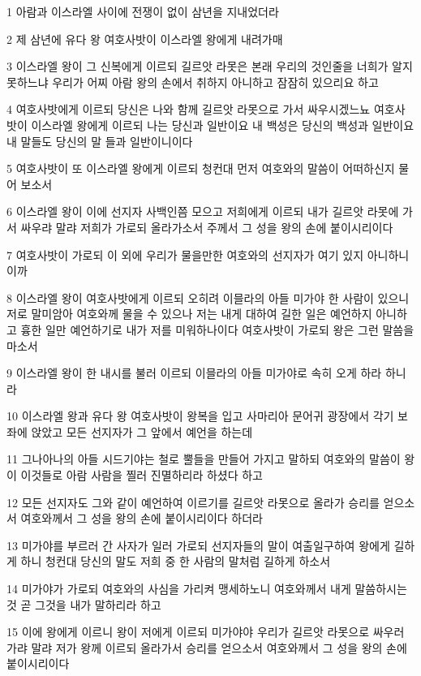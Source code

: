 \par 1 아람과 이스라엘 사이에 전쟁이 없이 삼년을 지내었더라
\par 2 제 삼년에 유다 왕 여호사밧이 이스라엘 왕에게 내려가매
\par 3 이스라엘 왕이 그 신복에게 이르되 길르앗 라못은 본래 우리의 것인줄을 너희가 알지 못하느냐 우리가 어찌 아람 왕의 손에서 취하지 아니하고 잠잠히 있으리요 하고
\par 4 여호사밧에게 이르되 당신은 나와 함께 길르앗 라못으로 가서 싸우시겠느뇨 여호사밧이 이스라엘 왕에게 이르되 나는 당신과 일반이요 내 백성은 당신의 백성과 일반이요 내 말들도 당신의 말 들과 일반이니이다
\par 5 여호사밧이 또 이스라엘 왕에게 이르되 청컨대 먼저 여호와의 말씀이 어떠하신지 물어 보소서
\par 6 이스라엘 왕이 이에 선지자 사백인쯤 모으고 저희에게 이르되 내가 길르앗 라못에 가서 싸우랴 말랴 저희가 가로되 올라가소서 주께서 그 성을 왕의 손에 붙이시리이다
\par 7 여호사밧이 가로되 이 외에 우리가 물을만한 여호와의 선지자가 여기 있지 아니하니이까
\par 8 이스라엘 왕이 여호사밧에게 이르되 오히려 이믈라의 아들 미가야 한 사람이 있으니 저로 말미암아 여호와께 물을 수 있으나 저는 내게 대하여 길한 일은 예언하지 아니하고 흉한 일만 예언하기로 내가 저를 미워하나이다 여호사밧이 가로되 왕은 그런 말씀을 마소서
\par 9 이스라엘 왕이 한 내시를 불러 이르되 이믈라의 아들 미가야로 속히 오게 하라 하니라
\par 10 이스라엘 왕과 유다 왕 여호사밧이 왕복을 입고 사마리아 문어귀 광장에서 각기 보좌에 앉았고 모든 선지자가 그 앞에서 예언을 하는데
\par 11 그나아나의 아들 시드기야는 철로 뿔들을 만들어 가지고 말하되 여호와의 말씀이 왕이 이것들로 아람 사람을 찔러 진멸하리라 하셨다 하고
\par 12 모든 선지자도 그와 같이 예언하여 이르기를 길르앗 라못으로 올라가 승리를 얻으소서 여호와께서 그 성을 왕의 손에 붙이시리이다 하더라
\par 13 미가야를 부르러 간 사자가 일러 가로되 선지자들의 말이 여출일구하여 왕에게 길하게 하니 청컨대 당신의 말도 저희 중 한 사람의 말처럼 길하게 하소서
\par 14 미가야가 가로되 여호와의 사심을 가리켜 맹세하노니 여호와께서 내게 말씀하시는 것 곧 그것을 내가 말하리라 하고
\par 15 이에 왕에게 이르니 왕이 저에게 이르되 미가야야 우리가 길르앗 라못으로 싸우러 가랴 말랴 저가 왕께 이르되 올라가서 승리를 얻으소서 여호와께서 그 성을 왕의 손에 붙이시리이다
